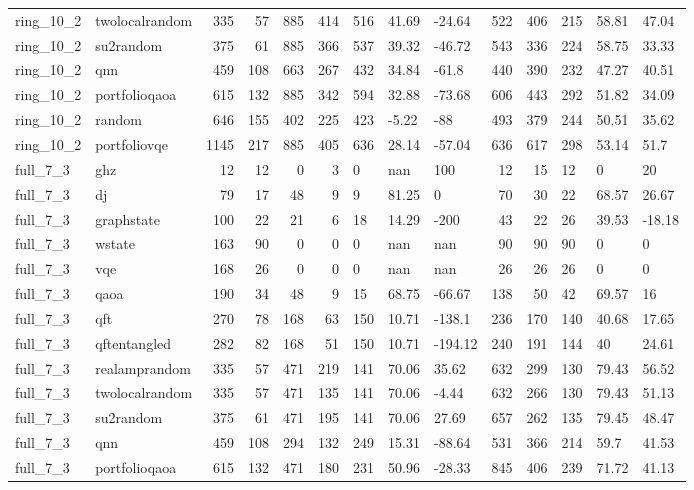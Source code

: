 \begin{longtable}{llrrrrlllrrlll}
ring\_10\_2 & twolocalrandom & 335 & 57 & 885 & 414 & 516 & 41.69 & -24.64 & 522 & 406 & 215 & 58.81 & 47.04 \\
ring\_10\_2 & su2random & 375 & 61 & 885 & 366 & 537 & 39.32 & -46.72 & 543 & 336 & 224 & 58.75 & 33.33 \\
ring\_10\_2 & qnn & 459 & 108 & 663 & 267 & 432 & 34.84 & -61.8 & 440 & 390 & 232 & 47.27 & 40.51 \\
ring\_10\_2 & portfolioqaoa & 615 & 132 & 885 & 342 & 594 & 32.88 & -73.68 & 606 & 443 & 292 & 51.82 & 34.09 \\
ring\_10\_2 & random & 646 & 155 & 402 & 225 & 423 & -5.22 & -88 & 493 & 379 & 244 & 50.51 & 35.62 \\
ring\_10\_2 & portfoliovqe & 1145 & 217 & 885 & 405 & 636 & 28.14 & -57.04 & 636 & 617 & 298 & 53.14 & 51.7 \\
full\_7\_3 & ghz & 12 & 12 & 0 & 3 & 0 & nan & 100 & 12 & 15 & 12 & 0 & 20 \\
full\_7\_3 & dj & 79 & 17 & 48 & 9 & 9 & 81.25 & 0 & 70 & 30 & 22 & 68.57 & 26.67 \\
full\_7\_3 & graphstate & 100 & 22 & 21 & 6 & 18 & 14.29 & -200 & 43 & 22 & 26 & 39.53 & -18.18 \\
full\_7\_3 & wstate & 163 & 90 & 0 & 0 & 0 & nan & nan & 90 & 90 & 90 & 0 & 0 \\
full\_7\_3 & vqe & 168 & 26 & 0 & 0 & 0 & nan & nan & 26 & 26 & 26 & 0 & 0 \\
full\_7\_3 & qaoa & 190 & 34 & 48 & 9 & 15 & 68.75 & -66.67 & 138 & 50 & 42 & 69.57 & 16 \\
full\_7\_3 & qft & 270 & 78 & 168 & 63 & 150 & 10.71 & -138.1 & 236 & 170 & 140 & 40.68 & 17.65 \\
full\_7\_3 & qftentangled & 282 & 82 & 168 & 51 & 150 & 10.71 & -194.12 & 240 & 191 & 144 & 40 & 24.61 \\
full\_7\_3 & realamprandom & 335 & 57 & 471 & 219 & 141 & 70.06 & 35.62 & 632 & 299 & 130 & 79.43 & 56.52 \\
full\_7\_3 & twolocalrandom & 335 & 57 & 471 & 135 & 141 & 70.06 & -4.44 & 632 & 266 & 130 & 79.43 & 51.13 \\
full\_7\_3 & su2random & 375 & 61 & 471 & 195 & 141 & 70.06 & 27.69 & 657 & 262 & 135 & 79.45 & 48.47 \\
full\_7\_3 & qnn & 459 & 108 & 294 & 132 & 249 & 15.31 & -88.64 & 531 & 366 & 214 & 59.7 & 41.53 \\
full\_7\_3 & portfolioqaoa & 615 & 132 & 471 & 180 & 231 & 50.96 & -28.33 & 845 & 406 & 239 & 71.72 & 41.13 \\

\end{longtable}
